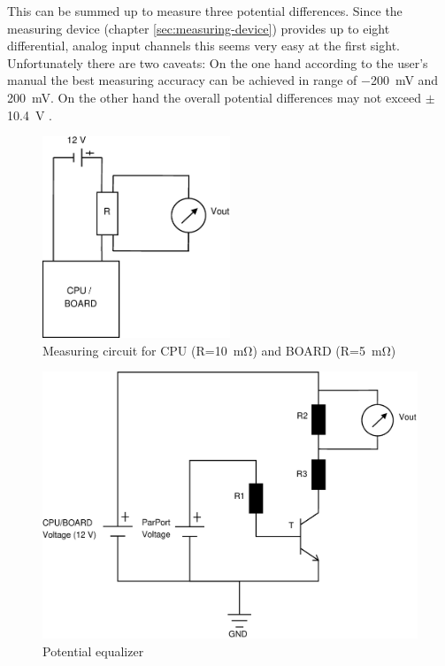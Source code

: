 This can be summed up to measure three potential differences. Since the
measuring device (chapter \ref{sec:measuring-device}) provides up to eight
differential, analog input channels this seems very easy at the first sight.
Unfortunately there are two caveats: On the one hand according to the user's
manual \cite{NIManual2009} the best measuring accuracy can be achieved in range
of \SI{-200}{\milli\volt} and \SI{200}{\milli\volt}. On the other hand the
overall potential differences may not exceed $\pm$\SI{10.4}{\volt}
\cite{NISpec2009}.

\begin{figure}
  \centering
    \includegraphics[width=0.5\textwidth]{fig/measuring-circuit.eps}
  \caption{Measuring circuit for CPU (R=\SI{10}{\milli\ohm}) and BOARD
(R=\SI{5}{\milli\ohm})}
  \label{fig:circuit}
\end{figure}

\begin{figure}
  \centering
    \includegraphics[width=\textwidth]{fig/potential-equalizer.eps}
  \caption{Potential equalizer}
  \label{fig:potential-equalizer}
\end{figure}

